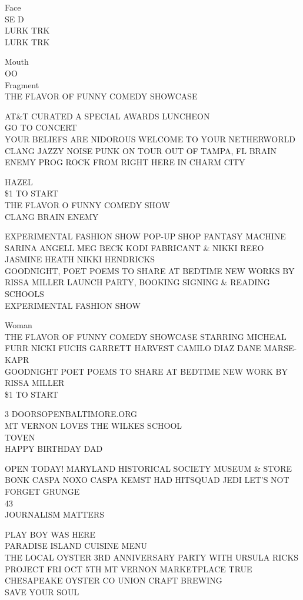 \documentclass[10pt,letterpaper]{article}
\begin{document}
Face\\
SE D\\
LURK TRK\\
LURK TRK

Mouth\\
OO\\
Fragment\\
THE FLAVOR OF FUNNY COMEDY SHOWCASE

AT\&T CURATED A SPECIAL AWARDS LUNCHEON\\
GO TO CONCERT\\
YOUR BELIEFS ARE NIDOROUS WELCOME TO YOUR NETHERWORLD\\
CLANG JAZZY NOISE PUNK ON TOUR OUT OF TAMPA, FL BRAIN ENEMY PROG ROCK FROM RIGHT HERE IN CHARM CITY

HAZEL\\
\$1 TO START\\
THE FLAVOR O FUNNY COMEDY SHOW\\
CLANG BRAIN ENEMY

EXPERIMENTAL FASHION SHOW POP{-}UP SHOP FANTASY MACHINE SARINA ANGELL MEG BECK KODI FABRICANT \& NIKKI  REEO JASMINE HEATH NIKKI HENDRICKS\\
GOODNIGHT, POET POEMS TO SHARE AT BEDTIME NEW WORKS BY RISSA MILLER LAUNCH PARTY, BOOKING SIGNING \& READING\\
SCHOOLS\\
EXPERIMENTAL FASHION SHOW

Woman\\
THE FLAVOR OF FUNNY COMEDY SHOWCASE STARRING MICHEAL FURR NICKI FUCHS GARRETT HARVEST CAMILO DIAZ DANE MARSE{-}KAPR\\
GOODNIGHT POET POEMS TO SHARE AT BEDTIME NEW WORK BY RISSA MILLER\\
\$1 TO START

3 DOORSOPENBALTIMORE.ORG\\
MT VERNON LOVES THE WILKES SCHOOL\\
TOVEN\\
HAPPY BIRTHDAY DAD

OPEN TODAY!  MARYLAND HISTORICAL SOCIETY MUSEUM \& STORE\\
BONK CASPA NOXO CASPA KEMST HAD HITSQUAD JEDI LET'S NOT FORGET GRUNGE\\
43\\
JOURNALISM MATTERS

PLAY BOY WAS HERE\\
PARADISE ISLAND CUISINE MENU\\
THE LOCAL OYSTER 3RD ANNIVERSARY PARTY WITH URSULA RICKS PROJECT FRI OCT 5TH MT VERNON MARKETPLACE TRUE CHESAPEAKE OYSTER CO UNION CRAFT BREWING\\
SAVE YOUR SOUL
\end{document}
